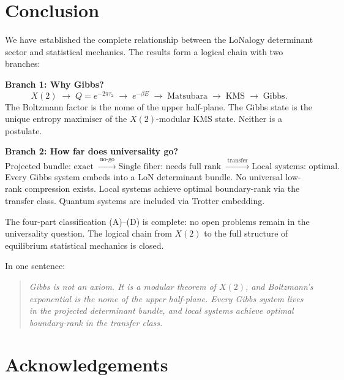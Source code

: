 \documentclass[12pt]{article}
\theoremstyle{plain}
\theoremstyle{definition}
\numberwithin{equation}{section}
\begin{document}
\section*{Conclusion}

We have established the complete relationship between the LoNalogy
determinant sector and statistical mechanics.  The results form a
logical chain with two branches:

\textbf{Branch 1: Why Gibbs?}
\begin{equation}
X(2)\;\to\; Q=e^{-2\pi\tau_2}\;\to\; e^{-\beta E}
\;\to\;\text{Matsubara}\;\to\;\text{KMS}\;\to\;\text{Gibbs}.
\end{equation}
The Boltzmann factor is the nome of the upper half-plane.  The Gibbs
state is the unique entropy maximiser of the $X(2)$-modular KMS state.
Neither is a postulate.

\textbf{Branch 2: How far does universality go?}
\begin{equation}
\text{Projected bundle: exact}
\;\xrightarrow{\;\text{no-go}\;}
\text{Single fiber: needs full rank}
\;\xrightarrow{\;\text{transfer}\;}
\text{Local systems: optimal.}
\end{equation}
Every Gibbs system embeds into a LoN determinant bundle.  No universal
low-rank compression exists.  Local systems achieve optimal
boundary-rank via the transfer class.  Quantum systems are included
via Trotter embedding.

The four-part classification (A)--(D) is complete: no open problems
remain in the universality question.  The logical chain from $X(2)$
to the full structure of equilibrium statistical mechanics is closed.

In one sentence:

\begin{quote}
\emph{Gibbs is not an axiom.  It is a modular theorem of $X(2)$, and
Boltzmann's exponential is the nome of the upper half-plane.  Every
Gibbs system lives in the projected determinant bundle, and local
systems achieve optimal boundary-rank in the transfer class.}
\end{quote}


\section*{Acknowledgements}
\end{document}
